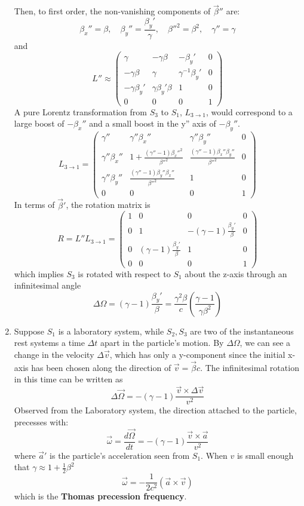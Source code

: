 \documentclass{article}
\begin{document}
\begin{enumerate}
		Then, to first order, the non-vanishing components of $\vec{\beta}''$ are:
		\[ \beta_x'' = \beta, \quad \beta_y'' = \frac{\beta_y'}{\gamma}, \quad \beta''^2 = \beta^2, \quad \gamma'' = \gamma \]
		and
		\[ L'' \approx 
		\begin{pmatrix}
			\gamma & -\gamma\beta & -\beta_y' & 0 \\
			-\gamma\beta & \gamma & \gamma^{-1}\beta_y' & 0 \\
			-\gamma\beta_y' & \gamma\beta_y'\beta & 1 & 0 \\
			0 & 0 & 0 & 1
		\end{pmatrix}
		\]
		A pure Lorentz transformation from $S_3$ to $S_1$, $L_{3\to1}$, would correspond to a large boost of $-\beta_x''$ and a small boost in the y'' axis of $-\beta_y''$.
		\[ L_{3\to1} = 
		\begin{pmatrix}
			\gamma'' & \gamma''\beta_x'' & \gamma''\beta_y'' & 0 \\
			\gamma''\beta_x'' & 1+\frac{(\gamma''-1)\beta_x''^2}{\beta''^2} & \frac{(\gamma''-1)\beta_x''\beta_y''}{\beta''^2} & 0 \\
			\gamma''\beta_y'' & \frac{(\gamma''-1)\beta_y''\beta_x''}{\beta''^2} & 1 & 0 \\
			0 & 0 & 0 & 1
		\end{pmatrix}
		\]
		In terms of $\vec{\beta}'$, the rotation matrix is
		\[ R = L'' L_{3\to1} = 
		\begin{pmatrix}
			1 & 0 & 0 & 0 \\
			0 & 1 & -(\gamma-1)\frac{\beta_y'}{\beta} & 0 \\
			0 & (\gamma-1)\frac{\beta_y'}{\beta} & 1 & 0 \\
			0 & 0 & 0 & 1
		\end{pmatrix}
		\]
		which implies $S_3$ is rotated with respect to $S_1$ about the z-axis through an infinitesimal angle
		\[ \Delta\Omega = (\gamma-1)\frac{\beta_y'}{\beta} = \frac{\gamma^2\beta}{c}(\frac{\gamma-1}{\gamma\beta^2}) \]
		
		\item Suppose $S_1$ is a laboratory system, while $S_2, S_3$ are two of the instantaneous rest systems a time $\Delta t$ apart in the particle's motion.
		By $\Delta\Omega$, we can see a change in the velocity $\Delta\vec{v}$, which has only a y-component since the initial x-axis has been chosen along the direction of $\vec{v} = \vec{\beta}c$.
		The infinitesimal rotation in this time can be written as
		\[ \Delta\vec{\Omega} = -(\gamma-1)\frac{\vec{v} \times \Delta\vec{v}}{v^2} \]
		Observed from the Laboratory system, the direction attached to the particle, precesses with:
		\[ \vec{\omega} = \frac{d\vec{\Omega}}{dt} = -(\gamma-1)\frac{\vec{v} \times \vec{a}}{v^2} \]
		where $\vec{a}'$ is the particle's acceleration seen from $S_1$.
		When $v$ is small enough that $\gamma \approx 1 + \frac{1}{2}\beta^2$
		\[ \vec{\omega} = -\frac{1}{2c^2}(\vec{a} \times \vec{v}) \]
		which is the \textbf{Thomas precession frequency}.
	\end{enumerate}
\end{document}
